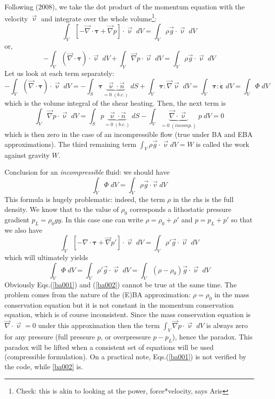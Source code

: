 Following \textcite{lezh08} (2008), we take the dot product of the momentum 
equation with the velocity $\vec{\upnu}$ and integrate over the whole 
volume\footnote{Check: this is akin to looking at the power, force*velocity,  says Arie}:
\[
\int_V \left[ -\vec\nabla \cdot {\bm \tau}  + \vec{\nabla} p \right] \cdot \vec{\upnu} \; dV  
= \int_V  \rho \vec{g} \cdot \vec{\upnu} \; dV
\]
or, 
\[
-\int_V (\vec\nabla \cdot {\bm \tau})\cdot \vec{\upnu} \; dV 
+\int_V \vec{\nabla} p \cdot \vec{\upnu} \; dV  
= \int_V  \rho \vec{g} \cdot \vec{\upnu} \; dV
\]
Let us look at each term separately:
\[
-\int_V (\vec\nabla \cdot {\bm \tau})\cdot \vec{\upnu} \; dV 
=-\int_S {\bm \tau} \underbrace{\vec{\upnu}\cdot \vec{n}}_{=0 \; (b.c.)} \; dS 
+ \int_V {\bm \tau}:\vec{\nabla} \vec{\upnu} \; dV 
= \int_V {\bm \tau}:\dot{\bm \varepsilon} \; dV 
= \int_V \Phi \; dV 
\]
which is the volume integral of the shear heating. Then, the next term is
\[
\int_V \vec{\nabla} p \cdot \vec{\upnu} \; dV  =
\int_S p \underbrace{ \vec{\upnu}\cdot \vec{n}}_{=0 \; (b.c.)} \; dS 
- \int_V \underbrace{ \vec{\nabla}\cdot \vec{\upnu}}_{=0 \; (incomp.)} \; p \; dV = 0 
\]
which is then zero in the case of an incompressible flow (true under BA and EBA approximations). 
The third remaining term $\int_V \rho \vec{g} \cdot \vec{\upnu} dV = W$ 
is called the work against gravity $W$. 

Conclusion for an {\it incompressible} fluid: we should have
\begin{equation}
\int_V \Phi \;  dV 
=
\int_V \rho \vec{g} \cdot \vec{v} \;  dV 
\label{ba001}
\end{equation}
This formula is hugely problematic: indeed, the term $\rho$ in the rhs is the full density. We know 
that to the value of $\rho_0$ corresponds a lithostatic pressure gradient $p_L=\rho_0 g y$. In this case one can write $\rho = \rho_0 + \rho'$ and $p=p_L + p'$
so that we also have 
\[
\int_V  \left[ -\nabla \cdot {\bm \tau}  
+ \vec{\nabla} p' \right] \cdot \vec{\upnu} \; dV  
= \int_V  \rho' \vec{g} \cdot \vec{\upnu} \; dV
\]
which will ultimately yields 
\begin{equation}
\int_V \Phi \; dV 
= \int_V \rho' \vec{g} \cdot \vec{\upnu} \; dV 
= \int_V (\rho-\rho_0) \vec{g} \cdot \vec{\upnu} \; dV 
\label{ba002}
\end{equation}
Obviously Eqs.(\ref{ba001}) and (\ref{ba002}) cannot be true at the same time.
The problem comes from the nature of the (E)BA approximation: 
$\rho=\rho_0$ in the mass conservation equation
but it is not constant in the momentum conservation equation, which 
is of course inconsistent. Since the mass 
conservation equation is ${\vec\nabla}\cdot \vec{\upnu}=0$ under 
this approximation then the term 
$\int_V {\vec \nabla} p \cdot \vec{\upnu} \; dV$ is always zero for any 
pressure (full pressure $p$, or overpressure $p-p_L$), 
hence the paradox. This paradox will be lifted when a consistent set 
of equations will be used (compressible formulation).
On a practical note, Eqs.(\ref{ba001}) is not verified by the code, while \eqref{ba002} is.   

